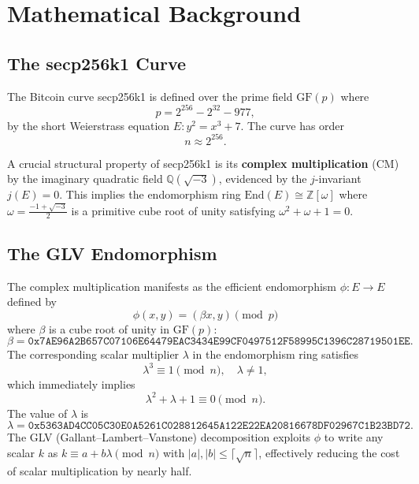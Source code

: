 \documentclass[11pt,a4paper]{article}
\theoremstyle{definition}
\newcommand{\Zomega}{\mathbb{Z}[\omega]}
\newcommand{\GF}{\mathrm{GF}}
\newcommand{\End}{\mathrm{End}}
\begin{document}
\section{Mathematical Background}\label{sec:background}

\subsection{The secp256k1 Curve}

The Bitcoin curve secp256k1 is defined over the prime field $\GF(p)$ where
\begin{equation}
p = 2^{256} - 2^{32} - 977,
\end{equation}
by the short Weierstrass equation $E: y^2 = x^3 + 7$. The curve has order
\begin{equation}
n \approx 2^{256}.
\end{equation}

A crucial structural property of secp256k1 is its \textbf{complex multiplication} (CM) by the imaginary quadratic field $\mathbb{Q}(\sqrt{-3})$, evidenced by the $j$-invariant $j(E) = 0$. This implies the endomorphism ring $\End(E) \cong \Zomega$ where $\omega = \frac{-1 + \sqrt{-3}}{2}$ is a primitive cube root of unity satisfying $\omega^2 + \omega + 1 = 0$.

\subsection{The GLV Endomorphism}

The complex multiplication manifests as the efficient endomorphism $\phi: E \to E$ defined by
\begin{equation}
\phi(x, y) = (\beta x, y) \pmod{p}
\end{equation}
where $\beta$ is a cube root of unity in $\GF(p)$:
\begin{equation}
\beta = \texttt{0x7AE96A2B657C07106E64479EAC3434E99CF0497512F58995C1396C28719501EE}.
\end{equation}
The corresponding scalar multiplier $\lambda$ in the endomorphism ring satisfies
\begin{equation}\label{eq:lambda}
\lambda^3 \equiv 1 \pmod{n}, \quad \lambda \neq 1,
\end{equation}
which immediately implies
\begin{equation}\label{eq:lambda-relation}
\lambda^2 + \lambda + 1 \equiv 0 \pmod{n}.
\end{equation}
The value of $\lambda$ is
\begin{equation}
\lambda = \texttt{0x5363AD4CC05C30E0A5261C028812645A122E22EA20816678DF02967C1B23BD72}.
\end{equation}
The GLV (Gallant--Lambert--Vanstone) decomposition exploits $\phi$ to write any scalar $k$ as $k \equiv a + b\lambda \pmod{n}$ with $|a|, |b| \leq \lceil\sqrt{n}\rceil$, effectively reducing the cost of scalar multiplication by nearly half.
\end{document}
